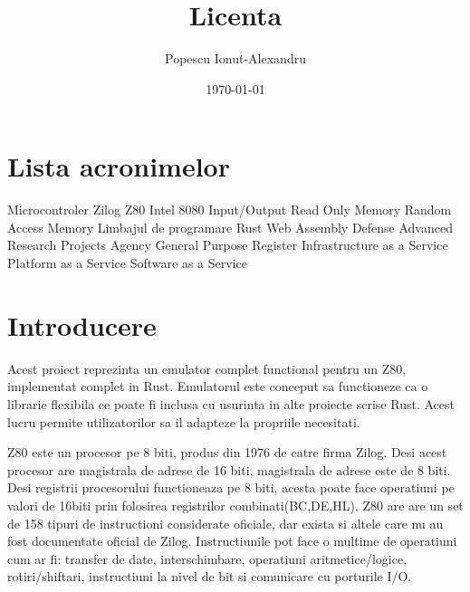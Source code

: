 \documentclass[titlepage,12pt]{article}
\begin{document}
    \title{Licenta}
    \author{Popescu Ionut-Alexandru}
    \date{\today}

    \maketitle
    \renewcommand{\contentsname}{Cuprins}
    \renewcommand{\listfigurename}{Lista figurilor}
    \renewcommand{\listtablename}{Lista tabelelor}
    \renewcommand{\figurename}{Figura}
    \renewcommand{\tablename}{Tabela}
    \renewcommand{\lstlistingname}{Cod}
    \tableofcontents
    \clearpage
    \listoffigures
    \clearpage
    \listoftables
    \clearpage
    \section*{Lista acronimelor} %
    \begin{acronym}
               {Microcontroler Zilog Z80}
             {Intel 8080}
                {Input/Output}
               {Read Only Memory}
               {Random Access Memory}
              {Limbajul de programare Rust}
              {Web Assembly}
             {Defense Advanced Research Projects Agency}
               {General Purpose Register}
              {Infrastructure as a Service}
              {Platform as a Service}
              {Software as a Service}
    \end{acronym}
    \clearpage


    \section{Introducere}
    Acest proiect reprezinta un emulator complet functional pentru un \ac {Z80}, implementat complet in \ac {Rust}.
    Emulatorul este conceput sa functioneze ca o librarie flexibila ce poate fi inclusa cu usurinta in alte proiecte scrise Rust. Acest lucru permite utilizatorilor sa il adapteze la propriile necesitati.

    \ac {Z80} este un procesor pe 8 biti, produs din 1976 de catre firma Zilog. Desi acest procesor are magistrala de adrese de 16 biti, magistrala de adrese este de 8 biti.
    Desi registrii procesorului functioneaza pe 8 biti, acesta poate face operatiuni pe valori de 16biti prin folosirea registrilor combinati(BC,DE,HL).
    Z80 are are un set de 158 tipuri de instructioni considerate oficiale, dar exista si altele care nu au fost documentate oficial de Zilog. Instructiunile pot face o multime de operatiuni cum ar fi: transfer de date, interschimbare, operatiuni aritmetice/logice, rotiri/shiftari, instructiuni la nivel de bit si comunicare cu porturile I/O.
\end{document}
